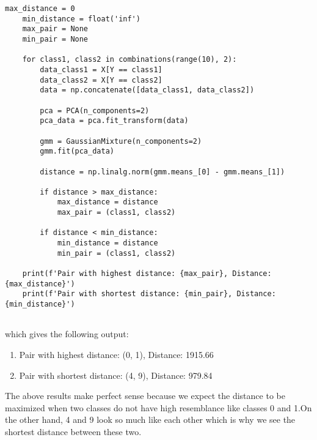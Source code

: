 \documentclass{article}
\begin{document}
\begin{lstlisting}[style=mystyle]
    max_distance = 0
    min_distance = float('inf')
    max_pair = None
    min_pair = None
    
    for class1, class2 in combinations(range(10), 2):
        data_class1 = X[Y == class1]
        data_class2 = X[Y == class2]
        data = np.concatenate([data_class1, data_class2])
        
        pca = PCA(n_components=2)
        pca_data = pca.fit_transform(data)
        
        gmm = GaussianMixture(n_components=2)
        gmm.fit(pca_data)
        
        distance = np.linalg.norm(gmm.means_[0] - gmm.means_[1])
        
        if distance > max_distance:
            max_distance = distance
            max_pair = (class1, class2)
        
        if distance < min_distance:
            min_distance = distance
            min_pair = (class1, class2)
    
    print(f'Pair with highest distance: {max_pair}, Distance: {max_distance}')
    print(f'Pair with shortest distance: {min_pair}, Distance: {min_distance}')
    
\end{lstlisting}

which gives the following output:

\begin{enumerate}
    \item Pair with highest distance: (0, 1), Distance: 1915.66
    \item Pair with shortest distance: (4, 9), Distance: 979.84
\end{enumerate}

The above results make perfect sense because we expect the distance to be maximized when two classes do not have high resemblance like classes
0 and 1.On the other hand, 4 and 9 look so much like each other which is why we see the shortest distance between these two.
\end{document}

